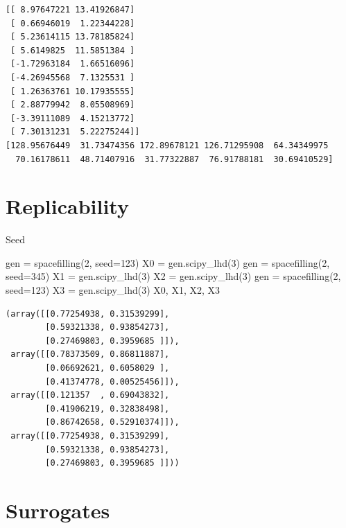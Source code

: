 \documentclass[
  letterpaper,
  DIV=11,
  numbers=noendperiod]{scrreprt}
\newenvironment{Shaded}{\begin{snugshade}}{\end{snugshade}}
\newcommand{\DecValTok}[1]{\textcolor[rgb]{0.68,0.00,0.00}{#1}}
\newcommand{\NormalTok}[1]{\textcolor[rgb]{0.00,0.23,0.31}{#1}}
\newcommand{\OperatorTok}[1]{\textcolor[rgb]{0.37,0.37,0.37}{#1}}
\begin{document}
\begin{verbatim}
[[ 8.97647221 13.41926847]
 [ 0.66946019  1.22344228]
 [ 5.23614115 13.78185824]
 [ 5.6149825  11.5851384 ]
 [-1.72963184  1.66516096]
 [-4.26945568  7.1325531 ]
 [ 1.26363761 10.17935555]
 [ 2.88779942  8.05508969]
 [-3.39111089  4.15213772]
 [ 7.30131231  5.22275244]]
[128.95676449  31.73474356 172.89678121 126.71295908  64.34349975
  70.16178611  48.71407916  31.77322887  76.91788181  30.69410529]
\end{verbatim}

\hypertarget{replicability}{%
\section{Replicability}\label{replicability}}

Seed

\begin{Shaded}
\begin{Highlighting}[]
\NormalTok{gen }\OperatorTok{=}\NormalTok{ spacefilling(}\DecValTok{2}\NormalTok{, seed}\OperatorTok{=}\DecValTok{123}\NormalTok{)}
\NormalTok{X0 }\OperatorTok{=}\NormalTok{ gen.scipy\_lhd(}\DecValTok{3}\NormalTok{)}
\NormalTok{gen }\OperatorTok{=}\NormalTok{ spacefilling(}\DecValTok{2}\NormalTok{, seed}\OperatorTok{=}\DecValTok{345}\NormalTok{)}
\NormalTok{X1 }\OperatorTok{=}\NormalTok{ gen.scipy\_lhd(}\DecValTok{3}\NormalTok{)}
\NormalTok{X2 }\OperatorTok{=}\NormalTok{ gen.scipy\_lhd(}\DecValTok{3}\NormalTok{)}
\NormalTok{gen }\OperatorTok{=}\NormalTok{ spacefilling(}\DecValTok{2}\NormalTok{, seed}\OperatorTok{=}\DecValTok{123}\NormalTok{)}
\NormalTok{X3 }\OperatorTok{=}\NormalTok{ gen.scipy\_lhd(}\DecValTok{3}\NormalTok{)}
\NormalTok{X0, X1, X2, X3}
\end{Highlighting}
\end{Shaded}

\begin{verbatim}
(array([[0.77254938, 0.31539299],
        [0.59321338, 0.93854273],
        [0.27469803, 0.3959685 ]]),
 array([[0.78373509, 0.86811887],
        [0.06692621, 0.6058029 ],
        [0.41374778, 0.00525456]]),
 array([[0.121357  , 0.69043832],
        [0.41906219, 0.32838498],
        [0.86742658, 0.52910374]]),
 array([[0.77254938, 0.31539299],
        [0.59321338, 0.93854273],
        [0.27469803, 0.3959685 ]]))
\end{verbatim}

\hypertarget{surrogates-1}{%
\section{Surrogates}\label{surrogates-1}}
\end{document}
